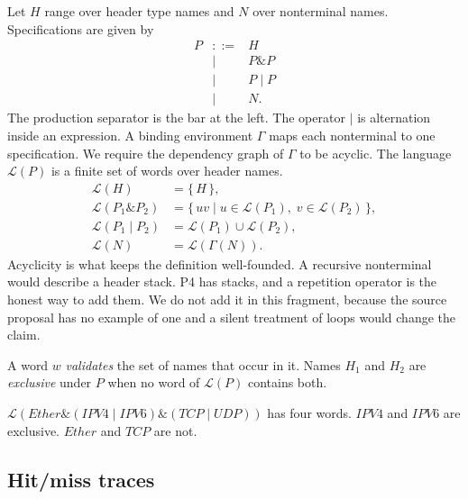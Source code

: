 \documentclass[a4paper,UKenglish,cleveref,autoref]{lipics-v2021}
\begin{document}
Let \(H\) range over header type names and \(N\) over nonterminal names.
Specifications are given by
\[
\begin{array}{rcl}
P & ::= & H \\
  & \mid & P \mathbin{\&} P \\
  & \mid & P \mathrel{\vert} P \\
  & \mid & N .
\end{array}
\]
The production separator is the bar at the left.
The operator \(\mathrel{\vert}\) is alternation inside an expression.
A binding environment \(\Gamma\) maps each nonterminal to one specification.
We require the dependency graph of \(\Gamma\) to be acyclic.
The language \(\mathcal{L}(P)\) is a finite set of words over header names.
\begin{align*}
  \mathcal{L}(H) &= \{\, H \,\}, \\
  \mathcal{L}(P_1 \mathbin{\&} P_2) &= \{\, uv \mid u \in \mathcal{L}(P_1),\; v \in \mathcal{L}(P_2) \,\}, \\
  \mathcal{L}(P_1 \mid P_2) &= \mathcal{L}(P_1) \cup \mathcal{L}(P_2), \\
  \mathcal{L}(N) &= \mathcal{L}(\Gamma(N)).
\end{align*}
Acyclicity is what keeps the definition well-founded.
A recursive nonterminal would describe a header stack.
P4 has stacks, and a repetition operator is the honest way to add them.
We do not add it in this fragment, because the source proposal has no example of one and a silent treatment of loops would change the claim.

A word \(w\) \emph{validates} the set of names that occur in it.
Names \(H_1\) and \(H_2\) are \emph{exclusive} under \(P\) when no word of \(\mathcal{L}(P)\) contains both.

\begin{example}
\label{ex:four}
\(\mathcal{L}(\mathit{Ether} \mathbin{\&} (\mathit{IPV4} \mid \mathit{IPV6}) \mathbin{\&} (\mathit{TCP} \mid \mathit{UDP}))\) has four words.
\(\mathit{IPV4}\) and \(\mathit{IPV6}\) are exclusive.
\(\mathit{Ether}\) and \(\mathit{TCP}\) are not.
\end{example}

\subsection{Hit/miss traces}
\end{document}
